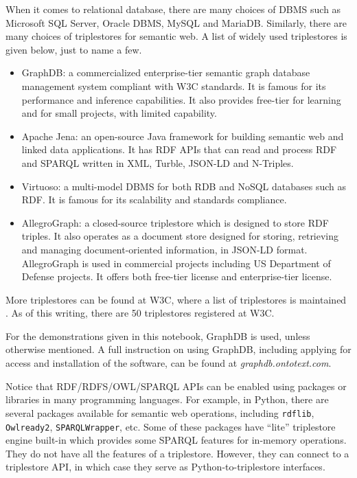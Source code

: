When it comes to relational database, there are many choices of DBMS such as Microsoft SQL Server, Oracle DBMS, MySQL and MariaDB. Similarly, there are many choices of triplestores for semantic web. A list of widely used triplestores is given below, just to name a few.
\begin{itemize}
	\item GraphDB: a commercialized enterprise-tier semantic graph database management system compliant with W3C standards. It is famous for its performance and inference capabilities. It also provides free-tier for learning and for small projects, with limited capability.
	\item Apache Jena: an open-source Java framework for building semantic web and linked data applications. It has RDF APIs that can read and process RDF and SPARQL written in XML, Turble, JSON-LD and N-Triples.
	\item Virtuoso: a multi-model DBMS for both RDB and NoSQL databases such as RDF. It is famous for its scalability and standards compliance.
	\item AllegroGraph: a closed-source triplestore which is designed to store RDF triples. It also operates as a document store designed for storing, retrieving and managing document-oriented information, in JSON-LD format. AllegroGraph is used in commercial projects including US Department of Defense projects. It offers both free-tier license and enterprise-tier license.
\end{itemize}

More triplestores can be found at W3C, where a list of triplestores is maintained \cite{triplestore,largetriplestore}. As of this writing, there are 50 triplestores registered at W3C.

For the demonstrations given in this notebook, GraphDB is used, unless otherwise mentioned. A full instruction on using GraphDB, including applying for access and installation of the software, can be found at \textit{graphdb.ontotext.com}.

Notice that RDF/RDFS/OWL/SPARQL APIs can be enabled using packages or libraries in many programming languages. For example, in Python, there are several packages available for semantic web operations, including \verb|rdflib|, \verb|Owlready2|, \verb|SPARQLWrapper|, etc. Some of these packages have ``lite'' triplestore engine built-in which provides some SPARQL features for in-memory operations. They do not have all the features of a triplestore. However, they can connect to a triplestore API, in which case they serve as Python-to-triplestore interfaces.

